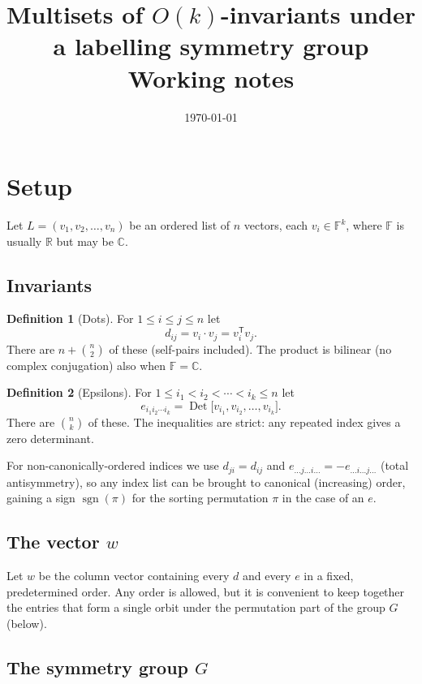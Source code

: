 \documentclass[11pt]{article}
\title{Multisets of $O(k)$-invariants under a labelling symmetry group\\
\large Working notes}
\author{}
\date{\today}
\theoremstyle{definition}
\newtheorem{definition}{Definition}
\theoremstyle{remark}
\newcommand{\F}{\mathbb{F}}
\newcommand{\Det}{\operatorname{Det}}
\begin{document}
\maketitle

\section{Setup}

Let $L = (v_1, v_2, \ldots, v_n)$ be an ordered list of $n$ vectors, each
$v_i \in \F^k$, where $\F$ is usually $\mathbb{R}$ but may be $\mathbb{C}$.

\subsection{Invariants}

\begin{definition}[Dots]
For $1 \le i \le j \le n$ let
\[
  d_{ij} = v_i \cdot v_j = v_i^{\mathsf T} v_j .
\]
There are $n + \binom{n}{2}$ of these (self-pairs included). The product is
bilinear (no complex conjugation) also when $\F = \mathbb{C}$.
\end{definition}

\begin{definition}[Epsilons]
For $1 \le i_1 < i_2 < \cdots < i_k \le n$ let
\[
  e_{i_1 i_2 \cdots i_k} = \Det\bigl[v_{i_1}, v_{i_2}, \ldots, v_{i_k}\bigr].
\]
There are $\binom{n}{k}$ of these. The inequalities are strict: any repeated
index gives a zero determinant.
\end{definition}

For non-canonically-ordered indices we use $d_{ji} = d_{ij}$ and
$e_{\ldots j \ldots i \ldots} = -e_{\ldots i \ldots j \ldots}$ (total
antisymmetry), so any index list can be brought to canonical (increasing)
order, gaining a sign $\operatorname{sgn}(\pi)$ for the sorting permutation
$\pi$ in the case of an $e$.

\subsection{The vector $w$}

Let $w$ be the column vector containing every $d$ and every $e$ in a fixed,
predetermined order. Any order is allowed, but it is convenient to keep
together the entries that form a single orbit under the permutation part of the
group $G$ (below).

\subsection{The symmetry group $G$}
\end{document}
